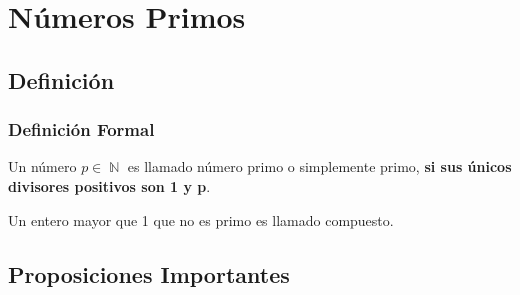 \documentclass[12pt, fleqn]{report}                             %
\DeclareMathOperator \Naturals  {\mathbb{N}}                     %
\begin{document}
\chapter{Números Primos}
    \clearpage

     

    \clearpage
    \section{Definición}

        \subsection*{Definición Formal}

            Un número $p \in \Naturals$ es llamado número primo o simplemente
            primo, \textbf{si sus únicos divisores positivos son 1 y p}.

            Un entero mayor que 1 que no es primo es llamado compuesto.

         
    \section{Proposiciones Importantes}
\end{document}
